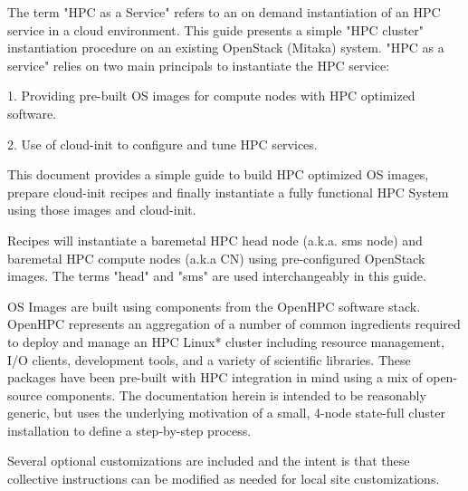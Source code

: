 The term "HPC as a Service" refers to an on demand instantiation of an HPC service in a cloud environment. This guide presents a simple "HPC cluster" instantiation procedure on an existing OpenStack (Mitaka) system. "HPC as a service" relies on two main principals to instantiate the HPC service:


\begin{list}{}
	\item 	1. Providing pre-built OS images for compute nodes with HPC optimized software.
	\item   2. Use of cloud-init to configure and tune HPC services.
	\item   
	 
\end{list}
	
This document provides a simple guide to build HPC optimized OS images, prepare cloud-init recipes and finally instantiate a fully functional HPC System using those images and cloud-init. 

Recipes will instantiate a baremetal HPC head node (a.k.a. sms node) and baremetal HPC compute nodes (a.k.a CN) using pre-configured OpenStack images. The terms "head" and "sms" are used interchangeably in this guide.

OS Images are built using components from the OpenHPC software stack. OpenHPC represents an aggregation of a number of common ingredients required to deploy and manage an HPC Linux* cluster including resource management, I/O clients, development tools, and a variety of scientific libraries. These packages have been pre-built with HPC integration in mind using a mix of open-source components. The documentation herein is intended to be reasonably generic,
but uses the underlying motivation of a small, 4-node state-full cluster installation to define a step-by-step process. 

Several optional customizations are included and the intent is that these collective instructions can be modified as needed for local site customizations.

